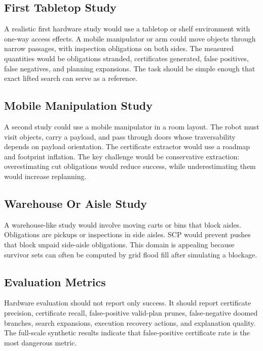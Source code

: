 \documentclass{article}
\begin{document}
\subsection{First Tabletop Study}

A realistic first hardware study would use a tabletop or shelf environment with one-way access effects. A mobile manipulator or arm could move objects through narrow passages, with inspection obligations on both sides. The measured quantities would be obligations stranded, certificates generated, false positives, false negatives, and planning expansions. The task should be simple enough that exact lifted search can serve as a reference.

\subsection{Mobile Manipulation Study}

A second study could use a mobile manipulator in a room layout. The robot must visit objects, carry a payload, and pass through doors whose traversability depends on payload orientation. The certificate extractor would use a roadmap and footprint inflation. The key challenge would be conservative extraction: overestimating cut obligations would reduce success, while underestimating them would increase replanning.

\subsection{Warehouse Or Aisle Study}

A warehouse-like study would involve moving carts or bins that block aisles. Obligations are pickups or inspections in side aisles. SCP would prevent pushes that block unpaid side-aisle obligations. This domain is appealing because survivor sets can often be computed by grid flood fill after simulating a blockage.

\subsection{Evaluation Metrics}

Hardware evaluation should not report only success. It should report certificate precision, certificate recall, false-positive valid-plan prunes, false-negative doomed branches, search expansions, execution recovery actions, and explanation quality. The full-scale synthetic results indicate that false-positive certificate rate is the most dangerous metric.
\end{document}
